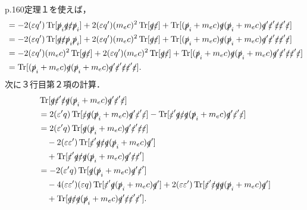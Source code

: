 p.160定理１を使えば，
\begin{align*}
  & = -2(\varepsilon q')\operatorname{Tr} [\slashed{p}_i\slashed{q}\slashed{\varepsilon}\slashed{p}_i] + 2(\varepsilon q')(m_ec)^2\operatorname{Tr} [\slashed{q}\slashed{\varepsilon}] + \operatorname{Tr} [(\slashed{p}_i+m_ec)\slashed{q}(\slashed{p}_i+m_ec)\slashed{q}'\slashed{\varepsilon}'\slashed{\varepsilon}\slashed{\varepsilon}'\slashed{\varepsilon}] \\
  & = -2(\varepsilon q')\operatorname{Tr} [\slashed{q}\slashed{\varepsilon}\slashed{p}_i\slashed{p}_i] + 2(\varepsilon q')(m_ec)^2\operatorname{Tr} [\slashed{q}\slashed{\varepsilon}] + \operatorname{Tr} [(\slashed{p}_i+m_ec)\slashed{q}(\slashed{p}_i+m_ec)\slashed{q}'\slashed{\varepsilon}'\slashed{\varepsilon}\slashed{\varepsilon}'\slashed{\varepsilon}] \\
  & = -2(\varepsilon q')(m_ec)^2\operatorname{Tr} [\slashed{q}\slashed{\varepsilon}] + 2(\varepsilon q')(m_ec)^2\operatorname{Tr} [\slashed{q}\slashed{\varepsilon}] + \operatorname{Tr} [(\slashed{p}_i+m_ec)\slashed{q}(\slashed{p}_i+m_ec)\slashed{q}'\slashed{\varepsilon}'\slashed{\varepsilon}\slashed{\varepsilon}'\slashed{\varepsilon}] \\
  & = \operatorname{Tr} [(\slashed{p}_i+m_ec)\slashed{q}(\slashed{p}_i+m_ec)\slashed{q}'\slashed{\varepsilon}'\slashed{\varepsilon}\slashed{\varepsilon}'\slashed{\varepsilon}].
\end{align*}
次に３行目第２項の計算．
\begin{align*}
  & \operatorname{Tr} [\slashed{q}\slashed{\varepsilon}'\slashed{\varepsilon}\slashed{q}(\slashed{p}_i+m_ec)\slashed{q}'\slashed{\varepsilon}'\slashed{\varepsilon}]\\
  & = 2(\varepsilon'q)\operatorname{Tr} [\slashed{\varepsilon}\slashed{q}(\slashed{p}_i+m_ec)\slashed{q}'\slashed{\varepsilon}'\slashed{\varepsilon}] - \operatorname{Tr} [\slashed{\varepsilon}'\slashed{q}\slashed{\varepsilon}\slashed{q}(\slashed{p}_i+m_ec)\slashed{q}'\slashed{\varepsilon}'\slashed{\varepsilon}]\\
  & = 2(\varepsilon'q)\operatorname{Tr} [\slashed{q}(\slashed{p}_i+m_ec)\slashed{q}'\slashed{\varepsilon}'\slashed{\varepsilon}\slashed{\varepsilon}] \\
  & \quad -2(\varepsilon\varepsilon')\operatorname{Tr} [\slashed{\varepsilon}'\slashed{q}\slashed{\varepsilon}\slashed{q}(\slashed{p}_i+m_ec)\slashed{q}']\\
  & \quad +\operatorname{Tr} [\slashed{\varepsilon}'\slashed{q}\slashed{\varepsilon}\slashed{q}(\slashed{p}_i+m_ec)\slashed{q}'\slashed{\varepsilon}\slashed{\varepsilon}']\\
  & = -2(\varepsilon'q)\operatorname{Tr} [\slashed{q}(\slashed{p}_i+m_ec)\slashed{q}'\slashed{\varepsilon}'] \\
  & \quad -4(\varepsilon\varepsilon')(\varepsilon q)\operatorname{Tr} [\slashed{\varepsilon}'\slashed{q}(\slashed{p}_i+m_ec)\slashed{q}']  + 2(\varepsilon\varepsilon')\operatorname{Tr} [\slashed{\varepsilon}'\slashed{\varepsilon}\slashed{q}\slashed{q}(\slashed{p}_i+m_ec)\slashed{q}']\\
  & \quad +\operatorname{Tr} [\slashed{q}\slashed{\varepsilon}\slashed{q}(\slashed{p}_i+m_ec)\slashed{q}'\slashed{\varepsilon}\slashed{\varepsilon}'\slashed{\varepsilon}'].
\end{align*}
